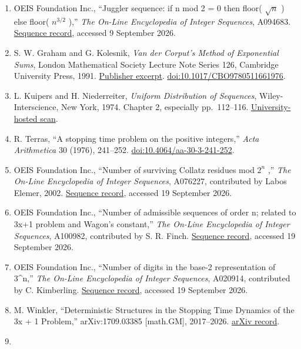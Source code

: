 \documentclass[11pt,a4paper]{article}
\providecommand{\tightlist}{\setlength{\itemsep}{0pt}\setlength{\parskip}{0pt}}
\begin{document}
\begin{enumerate}
\def\labelenumi{\arabic{enumi}.}
\tightlist
\item
  OEIS Foundation Inc., ``Juggler sequence: if n mod 2 = 0 then floor(
  \(\sqrt{n}\) ) else floor( \(n^{3/2}\) ),'' \emph{The On-Line
  Encyclopedia of Integer Sequences}, A094683.
  \href{https://oeis.org/A094683}{Sequence record}, accessed 9 September
  2026.
\item
  S. W. Graham and G. Kolesnik, \emph{Van der Corput's Method of
  Exponential Sums}, London Mathematical Society Lecture Note Series
  126, Cambridge University Press, 1991.
  \href{https://beckassets.blob.core.windows.net/product/readingsample/666252/9780521339278_excerpt_001.pdf}{Publisher
  excerpt}.
  \href{https://doi.org/10.1017/CBO9780511661976}{doi:10.1017/CBO9780511661976}.
\item
  L. Kuipers and H. Niederreiter, \emph{Uniform Distribution of
  Sequences}, Wiley-Interscience, New York, 1974. Chapter 2, especially
  pp.~112--116.
  \href{https://web.maths.unsw.edu.au/~josefdick/preprints/KuipersNied_book.pdf}{University-hosted
  scan}.
\item
  R. Terras, ``A stopping time problem on the positive integers,''
  \emph{Acta Arithmetica} 30 (1976), 241--252.
  \href{https://doi.org/10.4064/aa-30-3-241-252}{doi:10.4064/aa-30-3-241-252}.
\item
  OEIS Foundation Inc., ``Number of surviving Collatz residues mod
  \(2^n\) ,'' \emph{The On-Line Encyclopedia of Integer Sequences},
  A076227, contributed by Labos Elemer, 2002.
  \href{https://oeis.org/A076227}{Sequence record}, accessed 19
  September 2026.
\item
  OEIS Foundation Inc., ``Number of admissible sequences of order n;
  related to 3x+1 problem and Wagon's constant,'' \emph{The On-Line
  Encyclopedia of Integer Sequences}, A100982, contributed by S. R.
  Finch. \href{https://oeis.org/A100982}{Sequence record}, accessed 19
  September 2026.
\item
  OEIS Foundation Inc., ``Number of digits in the base-2 representation
  of 3\^{}n,'' \emph{The On-Line Encyclopedia of Integer Sequences},
  A020914, contributed by C. Kimberling.
  \href{https://oeis.org/A020914}{Sequence record}, accessed 19
  September 2026.
\item
  M. Winkler, ``Deterministic Structures in the Stopping Time Dynamics
  of the 3x + 1 Problem,'' arXiv:1709.03385 {[}math.GM{]}, 2017--2026.
  \href{https://arxiv.org/abs/1709.03385}{arXiv record}.
\item

\end{enumerate}
\end{document}
